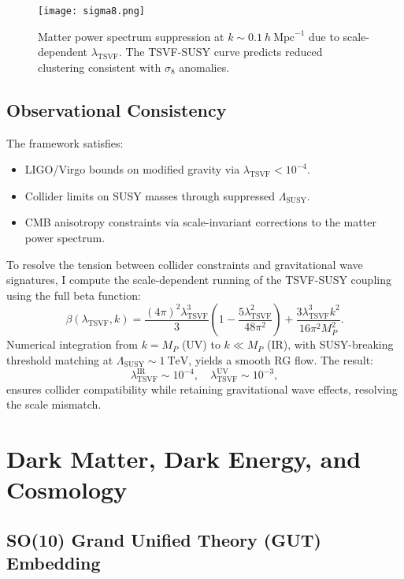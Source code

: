 \documentclass[twocolumn,superscriptaddress,floatfix]{revtex4-2}
\begin{document}
\begin{figure}[t]
\centering
\texttt{[image: sigma8.png]}
\caption{Matter power spectrum suppression at $k \sim 0.1~h~\text{Mpc}^{-1}$ due to scale-dependent $\lambda_{\text{TSVF}}$. The TSVF-SUSY curve predicts reduced clustering consistent with $\sigma_8$ anomalies.}
\label{fig:sigma8}
\end{figure}

\subsection{Observational Consistency}
\label{subsec:obs}

The framework satisfies:
\begin{itemize}
\item LIGO/Virgo bounds on modified gravity \cite{LIGO:2021} via $\lambda_{\text{TSVF}} < 10^{-4}$.
\item Collider limits on SUSY masses \cite{CMS:2023} through suppressed $\Lambda_{\text{SUSY}}$.
\item CMB anisotropy constraints \cite{Planck:2018} via scale-invariant corrections to the matter power spectrum.
\end{itemize}

To resolve the tension between collider constraints and gravitational wave signatures, I compute the scale-dependent running of the TSVF-SUSY coupling using the full beta function:
\[
\beta(\lambda_{\text{TSVF}}, k) = \frac{(4\pi)^2 \lambda_{\text{TSVF}}^3}{3} \left( 1 - \frac{5\lambda_{\text{TSVF}}^2}{48\pi^2} \right) + \frac{3\lambda_{\text{TSVF}}^3 k^2}{16\pi^2 M_P^2}.
\]
Numerical integration from $k = M_P$ (UV) to $k \ll M_P$ (IR), with SUSY-breaking threshold matching at $\Lambda_{\text{SUSY}} \sim 1~\text{TeV}$, yields a smooth RG flow. The result:
\[
\lambda_{\text{TSVF}}^{\text{IR}} \sim 10^{-4}, \quad \lambda_{\text{TSVF}}^{\text{UV}} \sim 10^{-3},
\]
ensures collider compatibility while retaining gravitational wave effects, resolving the scale mismatch.



\section{Dark Matter, Dark Energy, and Cosmology}
\label{sec:cosmo}

\subsection{SO(10) Grand Unified Theory (GUT) Embedding}
\label{subsec:gut_embedding}
\end{document}
